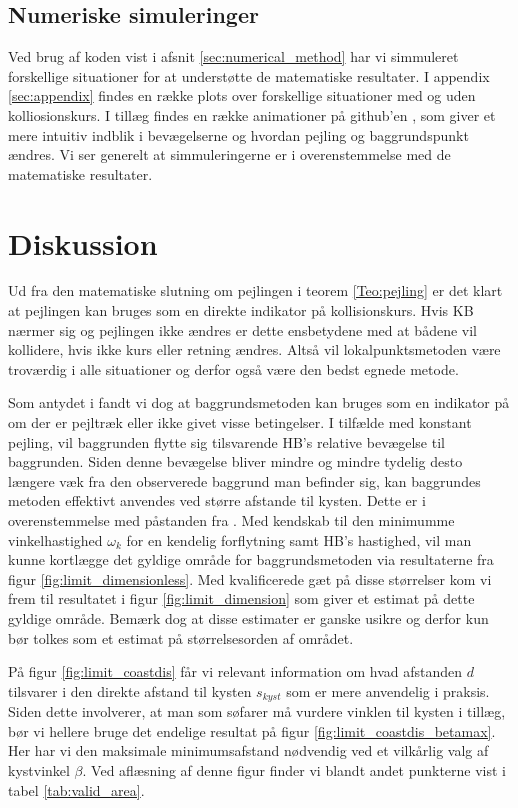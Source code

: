 \documentclass[%
 reprint,
nofootinbib,
aps,
]{revtex4-1}
\begin{document}
\subsection{Numeriske simuleringer}
Ved brug af koden vist i afsnit \ref{sec:numerical_method} har vi simmuleret forskellige situationer for at understøtte de matematiske resultater. I appendix \ref{sec:appendix} findes en række plots over forskellige situationer med og uden kolliosionskurs. I tillæg findes en række animationer på github'en \cite{github}, som giver et mere intuitiv indblik i bevægelserne og hvordan pejling og baggrundspunkt ændres. Vi ser generelt at simmuleringerne er i overenstemmelse med de matematiske resultater.


\section{Diskussion}
Ud fra den matematiske slutning om pejlingen i teorem \ref{Teo:pejling} er det klart at pejlingen kan bruges som en direkte indikator på kollisionskurs. Hvis KB nærmer sig og pejlingen ikke ændres er dette ensbetydene med at bådene vil kollidere, hvis ikke kurs eller retning ændres. Altså vil lokalpunktsmetoden være troværdig i alle situationer og derfor også være den bedst egnede metode. \par
Som antydet i \cite{duelighed} fandt vi dog at baggrundsmetoden kan bruges som en indikator på om der er pejltræk eller ikke givet visse betingelser. I tilfælde med konstant pejling, vil baggrunden flytte sig tilsvarende HB's relative bevægelse til baggrunden. Siden denne bevægelse bliver mindre og mindre tydelig desto længere væk fra den observerede baggrund man befinder sig, kan baggrundes metoden effektivt anvendes ved større afstande til kysten. Dette er i overenstemmelse med påstanden fra \cite{duelighed}. Med kendskab til den minimumme vinkelhastighed $\omega_k$ for en kendelig forflytning samt HB's hastighed, vil man kunne kortlægge det gyldige område for baggrundsmetoden via resultaterne fra figur \ref{fig:limit_dimensionless}. Med kvalificerede gæt på disse størrelser kom vi frem til resultatet i figur \ref{fig:limit_dimension} som giver et estimat på dette gyldige område. Bemærk dog at disse estimater er ganske usikre og derfor kun bør tolkes som et estimat på størrelsesorden af området. \par
På figur \ref{fig:limit_coastdis} får vi relevant information om hvad afstanden $d$ tilsvarer i den direkte afstand til kysten $s_{kyst}$ som er mere anvendelig i praksis. Siden dette involverer, at man som søfarer må vurdere vinklen til kysten i tillæg, bør vi hellere bruge det endelige resultat på figur \ref{fig:limit_coastdis_betamax}. Her har vi den maksimale minimumsafstand nødvendig ved et vilkårlig valg af kystvinkel $\beta$. Ved aflæsning af denne figur finder vi blandt andet punkterne vist i tabel \ref{tab:valid_area}.
\end{document}
